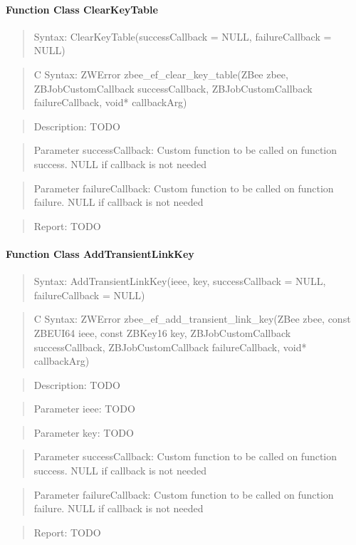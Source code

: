 \paragraph{Function Class ClearKeyTable}
\begin{quote}Syntax: ClearKeyTable(successCallback = NULL, failureCallback = NULL)\end{quote}
\begin{quote}C Syntax: ZWError zbee\_ef\_clear\_key\_table(ZBee zbee, ZBJobCustomCallback successCallback, ZBJobCustomCallback failureCallback, void* callbackArg)\end{quote}
\begin{quote}Description: TODO\end{quote}
\begin{quote}Parameter successCallback: Custom function to be called on function success. NULL if callback is not needed\end{quote}
\begin{quote}Parameter failureCallback: Custom function to be called on function failure. NULL if callback is not needed\end{quote}
\begin{quote}Report: TODO\end{quote}

\paragraph{Function Class AddTransientLinkKey}
\begin{quote}Syntax: AddTransientLinkKey(ieee, key, successCallback = NULL, failureCallback = NULL)\end{quote}
\begin{quote}C Syntax: ZWError zbee\_ef\_add\_transient\_link\_key(ZBee zbee, const ZBEUI64 ieee, const ZBKey16 key, ZBJobCustomCallback successCallback, ZBJobCustomCallback failureCallback, void* callbackArg)\end{quote}
\begin{quote}Description: TODO\end{quote}
\begin{quote}Parameter ieee: TODO\end{quote}
\begin{quote}Parameter key: TODO\end{quote}
\begin{quote}Parameter successCallback: Custom function to be called on function success. NULL if callback is not needed\end{quote}
\begin{quote}Parameter failureCallback: Custom function to be called on function failure. NULL if callback is not needed\end{quote}
\begin{quote}Report: TODO\end{quote}

